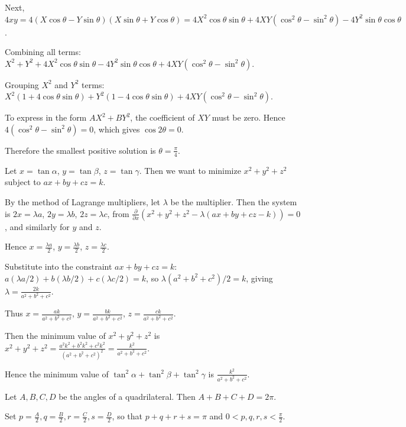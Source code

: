   Next, $4xy = 4 (X \cos\theta - Y \sin\theta)(X \sin\theta + Y \cos\theta) = 4 X^2 \cos\theta \sin\theta +
  4 XY (\cos^2\theta - \sin^2\theta) - 4 Y^2 \sin\theta \cos\theta$.

  Combining all terms: $X^2 + Y^2 + 4 X^2 \cos\theta \sin\theta - 4 Y^2 \sin\theta \cos\theta + 4 XY
  (\cos^2\theta - \sin^2\theta)$.

  Grouping $X^2$ and $Y^2$ terms: $X^2 (1 + 4 \cos\theta \sin\theta) + Y^2 (1 - 4 \cos\theta \sin\theta) + 4
  XY (\cos^2\theta - \sin^2\theta)$.

  To express in the form $A X^2 + B Y^2$, the coefficient of $XY$ must be zero. Hence
  $4 (\cos^2\theta - \sin^2\theta) = 0$, which gives $\cos 2\theta = 0$.

  Therefore the smallest positive solution is $\theta = \frac{\pi}{4}$.
\item Let $x = \tan\alpha$, $y = \tan\beta$, $z = \tan\gamma$. Then we want to minimize $x^2 + y^2 + z^2$
  subject to $a x + b y + c z = k$.

  By the method of Lagrange multipliers, let $\lambda$ be the multiplier. Then the system is
  $2x = \lambda a$, $2y = \lambda b$, $2z = \lambda c$, from $\frac{\partial}{\partial x}(x^2 + y^2 + z^2
  - \lambda(a x + b y + c z - k)) = 0$, and similarly for $y$ and $z$.

  Hence $x = \frac{\lambda a}{2}$, $y = \frac{\lambda b}{2}$, $z = \frac{\lambda c}{2}$.

  Substitute into the constraint $a x + b y + c z = k$:
  $a (\lambda a / 2) + b (\lambda b / 2) + c (\lambda c / 2) = k$, so $\lambda (a^2 + b^2 + c^2)/2 = k$,
  giving $\lambda = \frac{2 k}{a^2 + b^2 + c^2}$.

  Thus $x = \frac{a k}{a^2 + b^2 + c^2}$, $y = \frac{b k}{a^2 + b^2 + c^2}$, $z = \frac{c k}{a^2 + b^2 +
    c^2}$.

  Then the minimum value of $x^2 + y^2 + z^2$ is   $x^2 + y^2 + z^2 = \frac{a^2 k^2 + b^2 k^2 + c^2
    k^2}{(a^2 + b^2 + c^2)^2} = \frac{k^2}{a^2 + b^2 + c^2}$.

  Hence the minimum value of $\tan^2\alpha + \tan^2\beta + \tan^2\gamma$ is $\frac{k^2}{a^2 + b^2 + c^2}$.
\item Let $A, B, C, D$ be the angles of a quadrilateral. Then $A + B + C + D = 2 \pi$.

  Set $p = \frac{A}{2}, q = \frac{B}{2}, r = \frac{C}{2}, s = \frac{D}{2}$, so that $p + q + r + s = \pi$
  and $0 < p, q, r, s < \frac{\pi}{2}$.

